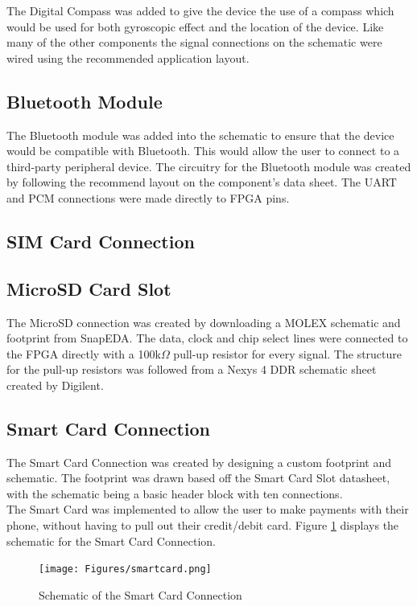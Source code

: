 	The Digital Compass was added to give the device the use of a compass which would be used for both gyroscopic effect and the location of the device.
Like many of the other components the signal connections on the schematic were wired using the recommended application layout. 

\subsection{Bluetooth Module}

	The Bluetooth module was added into the schematic to ensure that the device would be compatible with Bluetooth. This would allow the user to connect to a third-party peripheral device.
The circuitry for the Bluetooth module was created by following the recommend layout on the component's data sheet. The UART and PCM connections were made directly to FPGA pins. 

\subsection{SIM Card Connection}
\label{chap:SIM}

\subsection{MicroSD Card Slot}
\label{chap:SD}

	The MicroSD connection was created by downloading a MOLEX schematic and footprint from SnapEDA. The data, clock and chip select lines were connected to the FPGA directly with a 100k$\Omega$ pull-up resistor for every signal. The structure for the pull-up resistors was followed from a Nexys 4 DDR schematic sheet created by Digilent. 

\subsection{Smart Card Connection}
\label{chap:SC}

	The Smart Card Connection was created by designing a custom footprint and schematic. 
The footprint was drawn based off the Smart Card Slot datasheet, with the schematic being a basic header block with ten connections.\\
The Smart Card was implemented to allow the user to make payments with their phone, without having to pull out their credit/debit card.
Figure \ref{fig:SC} displays the schematic for the Smart Card Connection. 

\begin{figure}
	\texttt{[image: Figures/smartcard.png]}\centering
	\caption{Schematic of the Smart Card Connection}
	\label{fig:SC}
\end{figure}

